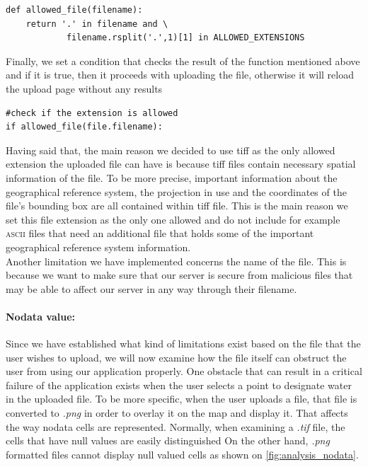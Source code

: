 \begin{lstlisting}
def allowed_file(filename):
	return '.' in filename and \
			filename.rsplit('.',1)[1] in ALLOWED_EXTENSIONS
\end{lstlisting}

Finally, we set a condition that checks the result of the function mentioned above and if it is true, then it proceeds with uploading the file, otherwise it will reload the upload page without any results

\begin{lstlisting}
#check if the extension is allowed
if allowed_file(file.filename):
\end{lstlisting}

Having said that, the main reason we decided to use tiff as the only allowed extension the uploaded file can have is because tiff files contain necessary spatial information of the file. To be more precise, important information about the geographical reference system, the projection in use and the coordinates of the file's bounding box are all contained within tiff file. This is the main reason we set this file extension as the only one allowed and do not include for example \textsc{ascii} files that need an additional file that holds some of the important geographical reference system information.\\

Another limitation we have implemented concerns the name of the file. This is because we want to make sure that  our server is secure from malicious files that may be able to affect our server in any way through their filename.

\paragraph{Nodata value:} Since we have established what kind of limitations exist based on the file that the user wishes to upload, we will now examine how the file itself can obstruct the user from using our application properly. 
One obstacle that can result in a critical failure of the application exists when the user selects a point to designate water in the uploaded file. To be more specific, when the user uploads a file, that file is converted to \textit{.png} in order to overlay it on the map and display it. That affects the way nodata cells are represented. Normally, when examining a \textit{.tif} file, the cells that have null values are easily distinguished
On the other hand, \textit{.png} formatted files cannot display null valued cells as shown on \autoref{fig:analysis_nodata}.

